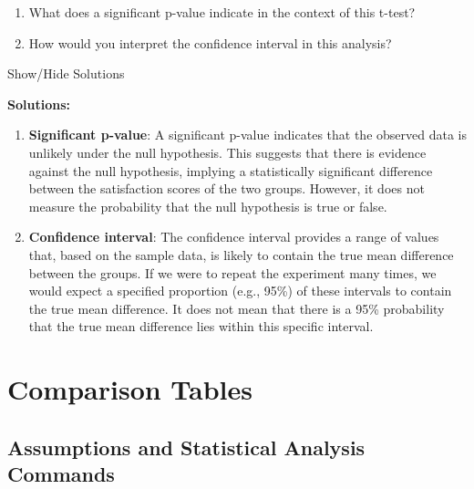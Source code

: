 \documentclass[
  letterpaper,
  DIV=11,
  numbers=noendperiod]{scrreprt}
\providecommand{\tightlist}{%
  \setlength{\itemsep}{0pt}\setlength{\parskip}{0pt}}\usepackage{longtable,booktabs,array}
\begin{document}
\begin{enumerate}
\def\labelenumi{\arabic{enumi}.}
\tightlist
\item
  What does a significant p-value indicate in the context of this
  t-test?
\item
  How would you interpret the confidence interval in this analysis?
\end{enumerate}

Show/Hide Solutions

\label{solutions}
\textbf{Solutions:}

\begin{enumerate}
\def\labelenumi{\arabic{enumi}.}
\item
  \textbf{Significant p-value}: A significant p-value indicates that the
  observed data is unlikely under the null hypothesis. This suggests
  that there is evidence against the null hypothesis, implying a
  statistically significant difference between the satisfaction scores
  of the two groups. However, it does not measure the probability that
  the null hypothesis is true or false.
\item
  \textbf{Confidence interval}: The confidence interval provides a range
  of values that, based on the sample data, is likely to contain the
  true mean difference between the groups. If we were to repeat the
  experiment many times, we would expect a specified proportion (e.g.,
  95\%) of these intervals to contain the true mean difference. It does
  not mean that there is a 95\% probability that the true mean
  difference lies within this specific interval.
\end{enumerate}

\section{Comparison Tables}\label{comparison-tables}

\subsection{Assumptions and Statistical Analysis
Commands}\label{assumptions-and-statistical-analysis-commands}
\end{document}
